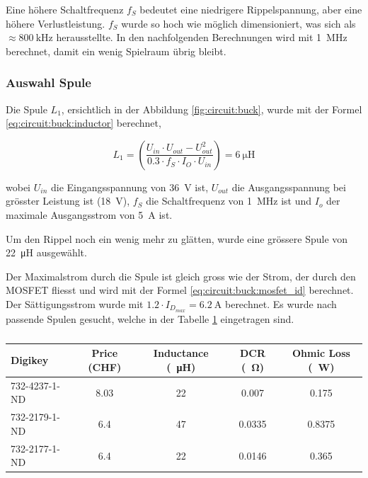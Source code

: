 Eine h\"ohere Schaltfrequenz $f_S$ bedeutet eine niedrigere Rippelspannung, aber
eine h\"ohere Verlustleistung. $f_S$ wurde so hoch wie m\"oglich  dimensioniert,
was sich als $\approx \SI{800}{\kilo\hertz}$ herausstellte. In den nachfolgenden
Berechnungen  wird mit \SI{1}{\mega\hertz} berechnet, damit ein wenig  Spielraum
\"ubrig bleibt.

\subsubsection*{Auswahl Spule}

Die Spule $L_1$, ersichtlich in der Abbildung \ref{fig:circuit:buck}, wurde  mit
der Formel \ref{eq:circuit:buck:inductor} berechnet,

\begin{equation}
    L_1 = \left( \frac{U_{in} \cdot U_{out} - U_{out}^2}{0.3 \cdot f_S \cdot I_O \cdot U_{in}} \right) = \SI{6}{\micro\henry}
    \label{eq:circuit:buck:inductor}
\end{equation}

wobei  $U_{in}$  die  Eingangsspannung von  \SI{36}{\volt}  ist,  $U_{out}$  die
Ausgangsspannung  bei  gr\"osster   Leistung  ist  (\SI{18}{\volt}),  $f_S$  die
Schaltfrequenz von  \SI{1}{\mega\hertz} ist und $I_o$ der maximale Ausgangsstrom
von \SI{5}{\ampere} ist.

Um den Rippel  noch ein wenig mehr zu gl\"atten, wurde eine gr\"ossere Spule von
\SI{22}{\micro\henry} ausgew\"ahlt.

Der Maximalstrom durch die Spule ist gleich gross wie  der  Strom, der durch den
MOSFET   fliesst   und   wird  mit  der  Formel  \ref{eq:circuit:buck:mosfet_id}
berechnet.  Der  S\"attigungsstrom   wurde   mit   $1.2   \cdot   I_{D_{max}}  =
\SI{6.2}{\ampere}$ berechnet. Es  wurde  nach passende Spulen gesucht, welche in
der Tabelle \ref{tab:circuit:buck:inductor} eingetragen sind.

\begin{table}[th!]
    \begin{center}
        \caption{}
        \label{tab:circuit:buck:inductor}
        \begin{tabular}{lcccc}
            \toprule
            Digikey         & Price (CHF) & Inductance (\SI{}{\micro\henry}) & DCR (\SI{}{\ohm}) & Ohmic Loss (\SI{}{\watt}) \\
            \midrule
            \rowcolor{lightgray}
            732-4237-1-ND   & 8.03        & 22                               & 0.007             & 0.175  \\
            732-2179-1-ND   & 6.4         & 47                               & 0.0335            & 0.8375 \\
            732-2177-1-ND   & 6.4         & 22                               & 0.0146            & 0.365  \\
            \bottomrule
        \end{tabular}
    \end{center}
\end{table}

